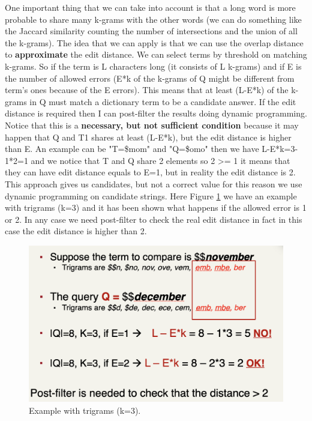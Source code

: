One important thing that we can take into account is that a long word is more probable to share many k-grams with the other words (we can do something like the Jaccard similarity counting the number of intersections and the union of all the k-grams).\newline
The idea that we can apply is that we can use the overlap distance to \textbf{approximate} the edit distance. We can select terms by threshold on matching k-grams. So if the term is L characters long (it consists of L k-grams) and if E is the number of allowed errors (E*k of the k-grams of Q might be different from term's ones because of the E errors).\newline
This means that at least (L-E*k) of the k-grams in Q must match a dictionary term to be a candidate answer. If the edit distance is required then I can post-filter the results doing dynamic programming.\newline
Notice that this is a \textbf{necessary, but not sufficient condition} because it may happen that Q and T1 shares at least (L-E*k), but the edit distance is higher than E.\newline
An example can be "T=\$mom" and "Q=\$omo" then we have L-E*k=3-1*2=1 and we notice that T and Q share 2 elements so 2 >= 1 it means that they can have edit distance equals to E=1, but in reality the edit distance is 2. This approach gives us candidates, but not a correct value for this reason we use dynamic programming on candidate strings.\newline
Here Figure \ref{fig:exampletrigrams} we have an example with trigrams (k=3) and it has been shown what happens if the allowed error is 1 or 2. In any case we need post-filter to check the real edit distance in fact in this case the edit distance is higher than 2.\newline
\begin{figure}
    \centering
    \includegraphics[width=0.75\linewidth]{images/exampletrigrams.png}
    \caption{Example with trigrams (k=3).}
    \label{fig:exampletrigrams}
\end{figure}
